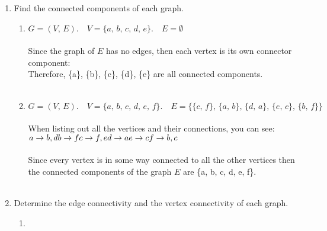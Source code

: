\documentclass{amsart}
\theoremstyle{definition}
\theoremstyle{Exercise}
\theoremstyle{remark}
\theoremstyle{rule}
\numberwithin{equation}{section}
\begin{document}
\begin{enumerate}[label=(\alph*)]
\item Find the connected components of each graph.\\
    \begin{enumerate}[label=(\roman*)]
    \item $G = (V, \,E).\quad V = \{a,\, b,\, c,\, d,\,  e\}.\quad E = \emptyset$\\\\
Since the graph of $E$ has no edges, then each vertex is its own connector component:\\
Therefore, \{a\}, \{b\}, \{c\}, \{d\}, \{e\} are all connected components.
\\\\
    \item $G = (V,\, E).\quad V = \{a,\, b,\, c,\, d,\, e,\, f\}.\quad E = \{ \{c,\, f\}, \,\{a,\, b\},\, \{d,\, a\}, \,\{e,\, c\},\, \{b,\, f\} \}$\\\\
When listing out all the vertices and their connections, you can see:\\
$a \rightarrow b, d\\
b \rightarrow f\\
c \rightarrow f, e\\
d \rightarrow a\\
e \rightarrow c\\
f \rightarrow b, c$\\\\
Since every vertex is in some way connected to all the other vertices then the connected components of the graph $E$ are \{a, b, c, d, e, f\}.
\\\\
    \end{enumerate}
\item Determine the edge connectivity and the vertex connectivity of each graph.\\

    \begin{enumerate}[label=(\roman*)]    
 \item
{}
\end{enumerate}
\end{enumerate}
\end{document}
